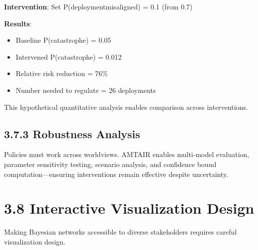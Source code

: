 \documentclass[
  11pt,
  letterpaper,
]{book}
\providecommand{\tightlist}{%
  \setlength{\itemsep}{0pt}\setlength{\parskip}{0pt}}
\begin{document}
\textbf{Intervention}: Set P(deployment\textbar misaligned) = 0.1 (from
0.7)

\textbf{Results}:

\begin{itemize}
\tightlist
\item
  Baseline P(catastrophe) = 0.05
\item
  Intervened P(catastrophe) = 0.012
\item
  Relative risk reduction = 76\%
\item
  Number needed to regulate = 26 deployments
\end{itemize}

This hypothetical quantitative analysis enables comparison across
interventions.

\subsection*{3.7.3 Robustness Analysis}\label{sec-robustness}

\begin{tcolorbox}[enhanced jigsaw, opacitybacktitle=0.6, colbacktitle=quarto-callout-tip-color!10!white, toptitle=1mm, colback=white, breakable, left=2mm, bottomrule=.15mm, title=\textcolor{quarto-callout-tip-color}{\faLightbulb}\hspace{0.5em}{Cross-Worldview Robustness}, rightrule=.15mm, arc=.35mm, toprule=.15mm, opacityback=0, colframe=quarto-callout-tip-color-frame, bottomtitle=1mm, titlerule=0mm, leftrule=.75mm, coltitle=black]

Policies must work across worldviews. AMTAIR enables multi-model
evaluation, parameter sensitivity testing, scenario analysis, and
confidence bound computation---ensuring interventions remain effective
despite uncertainty.

\end{tcolorbox}

\section*{3.8 Interactive Visualization
Design}\label{sec-visualization-design}


Making Bayesian networks accessible to diverse stakeholders requires
careful visualization design.
\end{document}
